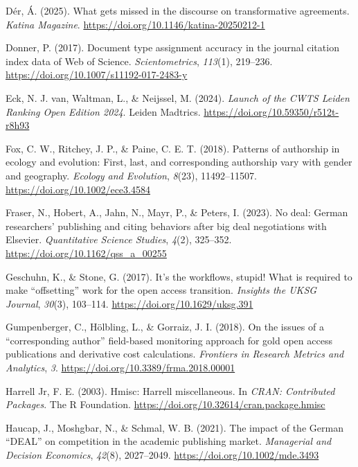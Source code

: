 \documentclass[a4paper,man,floatsintext,longtable,noextraspace,10pt]{apa6}
\newlength{\cslhangindent}
\newenvironment{CSLReferences}[2] %
{\begin{list}{}{%
  \setlength{\itemindent}{0pt}
  \setlength{\leftmargin}{0pt}
  \setlength{\parsep}{0pt}
  \ifodd #1
  \setlength{\leftmargin}{\cslhangindent}
  \setlength{\itemindent}{-1\cslhangindent}
  \fi
  \setlength{\itemsep}{#2\baselineskip}}}
{\end{list}}
\begin{document}
\begin{CSLReferences}{1}{0}
Dér, Á. (2025). What gets missed in the discourse on transformative
agreements. \emph{Katina Magazine}.
\url{https://doi.org/10.1146/katina-20250212-1}

Donner, P. (2017). Document type assignment accuracy in the journal
citation index data of {Web of Science}. \emph{Scientometrics},
\emph{113}(1), 219--236. \url{https://doi.org/10.1007/s11192-017-2483-y}

Eck, N. J. van, Waltman, L., \& Neijssel, M. (2024). \emph{{Launch of
the CWTS Leiden Ranking Open Edition 2024}}. Leiden Madtrics.
\url{https://doi.org/10.59350/r512t-r8h93}

Fox, C. W., Ritchey, J. P., \& Paine, C. E. T. (2018). Patterns of
authorship in ecology and evolution: First, last, and corresponding
authorship vary with gender and geography. \emph{Ecology and Evolution},
\emph{8}(23), 11492--11507. \url{https://doi.org/10.1002/ece3.4584}

Fraser, N., Hobert, A., Jahn, N., Mayr, P., \& Peters, I. (2023). No
deal: German researchers' publishing and citing behaviors after big deal
negotiations with {Elsevier}. \emph{Quantitative Science Studies},
\emph{4}(2), 325--352. \url{https://doi.org/10.1162/qss_a_00255}

Geschuhn, K., \& Stone, G. (2017). It's the workflows, stupid! What is
required to make {``offsetting''} work for the open access transition.
\emph{Insights the {UKSG} Journal}, \emph{30}(3), 103--114.
\url{https://doi.org/10.1629/uksg.391}

Gumpenberger, C., Hölbling, L., \& Gorraiz, J. I. (2018). On the issues
of a {``corresponding author''} field-based monitoring approach for gold
open access publications and derivative cost calculations.
\emph{Frontiers in Research Metrics and Analytics}, \emph{3}.
\url{https://doi.org/10.3389/frma.2018.00001}

Harrell Jr, F. E. (2003). Hmisc: Harrell miscellaneous. In \emph{CRAN:
Contributed Packages}. The R Foundation.
\url{https://doi.org/10.32614/cran.package.hmisc}

Haucap, J., Moshgbar, N., \& Schmal, W. B. (2021). The impact of the
{German {``DEAL''}} on competition in the academic publishing market.
\emph{Managerial and Decision Economics}, \emph{42}(8), 2027--2049.
\url{https://doi.org/10.1002/mde.3493}


\end{CSLReferences}
\end{document}
